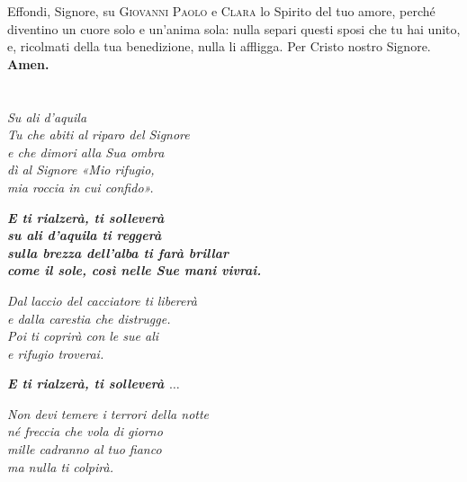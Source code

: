 \documentclass[10pt,b6paper,usenames,twoside]{article}
\begin{document}
\noindent Effondi, Signore, su \textcolor{forestgreen(traditional)}{\textsc{Giovanni Paolo}} e \textcolor{forestgreen(traditional)}{\textsc{Clara}} lo Spirito del tuo amore, perché diventino un cuore solo e un'anima sola: nulla separi questi sposi che tu hai unito, e, ricolmati della tua benedizione, nulla li affligga. Per Cristo nostro Signore.\\ 
\textbf{Amen.} 

\clearpage

\section*{\textcolor{forestgreen(traditional)}{}} 
\vspace*{-1mm}
\noindent \textcolor{forestgreen(traditional)}{\Acht} \hspace*{0mm}  \textit {Su ali d'aquila}\\

\noindent \textit{Tu che abiti al riparo del Signore\\
e che dimori alla Sua ombra\\
dì al Signore «Mio rifugio,\\
mia roccia in cui confido».}\\

\hfill\begin{minipage}{\dimexpr\textwidth-1cm}
\textbf{\textit{E ti rialzerà, ti solleverà\\
su ali d'aquila ti reggerà\\
sulla brezza dell'alba ti farà brillar\\
come il sole, così nelle Sue mani vivrai.}}\\
\end{minipage}

\noindent \textit{Dal laccio del cacciatore ti libererà\\
e dalla carestia che distrugge.\\
Poi ti coprirà con le sue ali\\
e rifugio troverai.}\\

\hfill\begin{minipage}{\dimexpr\textwidth-1cm}
\textbf{\textit{E ti rialzerà, ti solleverà $\hdots$}}\\
\end{minipage}

\noindent \textit{Non devi temere i terrori della notte\\
né freccia che vola di giorno\\
mille cadranno al tuo fianco\\
ma nulla ti colpirà.}\\
\end{document}
